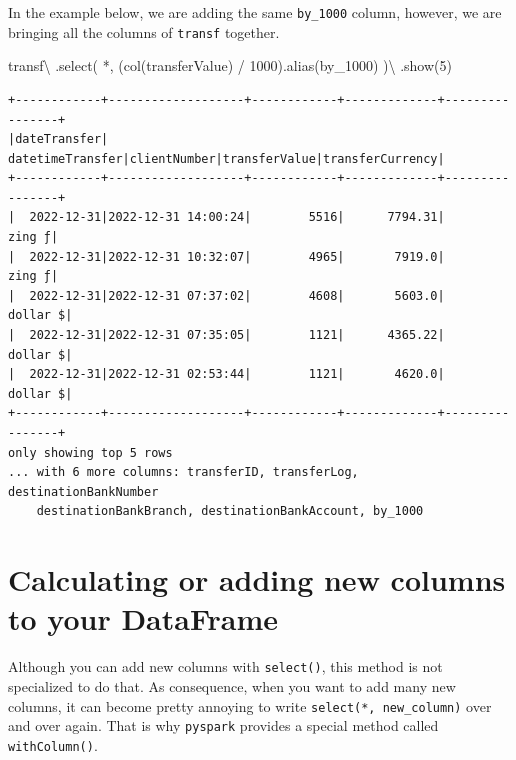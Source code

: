 \documentclass[
  11pt,
  letterpaper,
  DIV=11,
  numbers=noendperiod]{scrreprt}
\newenvironment{Shaded}{\begin{snugshade}}{\end{snugshade}}
\newcommand{\DecValTok}[1]{\textcolor[rgb]{0.68,0.00,0.00}{#1}}
\newcommand{\NormalTok}[1]{\textcolor[rgb]{0.00,0.23,0.31}{#1}}
\newcommand{\OperatorTok}[1]{\textcolor[rgb]{0.37,0.37,0.37}{#1}}
\newcommand{\StringTok}[1]{\textcolor[rgb]{0.13,0.47,0.30}{#1}}
\begin{document}
In the example below, we are adding the same \texttt{by\_1000} column,
however, we are bringing all the columns of \texttt{transf} together.

\begin{Shaded}
\begin{Highlighting}[]
\NormalTok{transf}\OperatorTok{\textbackslash{}}
\NormalTok{  .select(}
    \StringTok{\textquotesingle{}*\textquotesingle{}}\NormalTok{,}
\NormalTok{    (col(}\StringTok{\textquotesingle{}transferValue\textquotesingle{}}\NormalTok{) }\OperatorTok{/} \DecValTok{1000}\NormalTok{).alias(}\StringTok{\textquotesingle{}by\_1000\textquotesingle{}}\NormalTok{)}
\NormalTok{  )}\OperatorTok{\textbackslash{}}
\NormalTok{  .show(}\DecValTok{5}\NormalTok{)}
\end{Highlighting}
\end{Shaded}

\begin{verbatim}
+------------+-------------------+------------+-------------+----------------+
|dateTransfer|   datetimeTransfer|clientNumber|transferValue|transferCurrency|
+------------+-------------------+------------+-------------+----------------+
|  2022-12-31|2022-12-31 14:00:24|        5516|      7794.31|          zing ƒ|
|  2022-12-31|2022-12-31 10:32:07|        4965|       7919.0|          zing ƒ|
|  2022-12-31|2022-12-31 07:37:02|        4608|       5603.0|        dollar $|
|  2022-12-31|2022-12-31 07:35:05|        1121|      4365.22|        dollar $|
|  2022-12-31|2022-12-31 02:53:44|        1121|       4620.0|        dollar $|
+------------+-------------------+------------+-------------+----------------+
only showing top 5 rows
... with 6 more columns: transferID, transferLog, destinationBankNumber
    destinationBankBranch, destinationBankAccount, by_1000
\end{verbatim}

\hypertarget{calculating-or-adding-new-columns-to-your-dataframe}{%
\section{Calculating or adding new columns to your
DataFrame}\label{calculating-or-adding-new-columns-to-your-dataframe}}

Although you can add new columns with \texttt{select()}, this method is
not specialized to do that. As consequence, when you want to add many
new columns, it can become pretty annoying to write
\texttt{select(\textquotesingle{}*\textquotesingle{},\ new\_column)}
over and over again. That is why \texttt{pyspark} provides a special
method called \texttt{withColumn()}.
\end{document}
